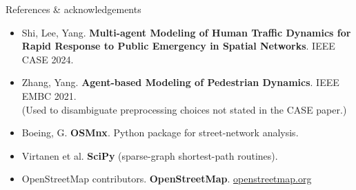 \documentclass[aspectratio=169, xcolor=table]{beamer}
\begin{document}
\begin{frame}[t]{References \& acknowledgements}
\footnotesize

\begin{itemize}\itemsep0.4em
  \item Shi, Lee, Yang. \textbf{Multi-agent Modeling of Human Traffic Dynamics for Rapid Response to Public Emergency in Spatial Networks}. IEEE CASE 2024.
  \item Zhang, Yang. \textbf{Agent-based Modeling of Pedestrian Dynamics}. IEEE EMBC 2021.\\
        {\scriptsize (Used to disambiguate preprocessing choices not stated in the CASE paper.)}
  \item Boeing, G. \textbf{OSMnx}. Python package for street-network analysis.
  \item Virtanen et al. \textbf{SciPy} (sparse-graph shortest-path routines).
  \item OpenStreetMap contributors. \textbf{OpenStreetMap}. \url{openstreetmap.org}
\end{itemize}

\vspace{1em}
\begin{center}
\end{center}
\end{frame}

\appendix
\end{document}
